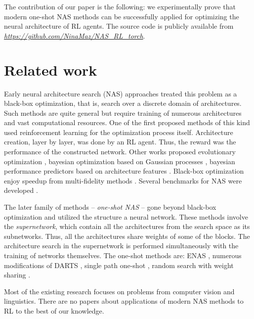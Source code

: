 \documentclass{svproc}
\begin{document}
The contribution of our paper is the following: we experimentally prove that modern one-shot NAS methods can be successfully applied for optimizing the neural architecture of RL agents. 
The source code is publicly available from \textit{\url{https://github.com/NinaMaz/NAS_RL_torch}}.


\section{Related work}
Early neural architecture search (NAS) approaches
treated this problem as a black-box optimization, that is, search over a discrete domain of architectures. Such methods are quite general but require training of numerous architectures and vast computational resources. One of the first proposed methods of this kind \cite{zoph2016neural, zoph2018learning} used reinforcement learning for the optimization process itself. Architecture creation, layer by layer, was done by an RL agent. Thus, the reward was the performance of the constructed network.
Other works proposed evolutionary optimization \cite{real2019regularized}, bayesian optimization based on Gaussian processes \cite{kandasamy2018neural}, bayesian performance predictors based on architecture features \cite{white2019bananas, shi2019multi}. Black-box optimization enjoy speedup from multi-fidelity methods \cite{trofimov2020multi}. Several benchmarks for NAS were developed \cite{ying2019bench, klyuchnikov2020bench, dong2020bench}.

The later family of methods -- \textit{one-shot NAS} -- gone beyond black-box optimization and utilized the structure a neural network. These methods involve the \textit{supernetwork}, which contain all the architectures from the search space as its subnetworks. Thus, all the architectures share weights of some of the blocks.
The architecture search in the supernetwork is performed simultaneously with the training of networks themselves. 
The one-shot methods are: ENAS \cite{pham2018efficient}, numerous modifications of DARTS \cite{liu2018darts, xu2019pc, chen2019progressive, liang2019darts+, dong2019searching, cai2018proxylessnas}, single path one-shot \cite{guo2019single}, random search with weight sharing \cite{li2019random, bender2019understanding}.

Most of the existing research focuses on problems from computer vision and linguistics.
There are no papers about applications of modern NAS methods to RL to the best of our knowledge.
\end{document}
